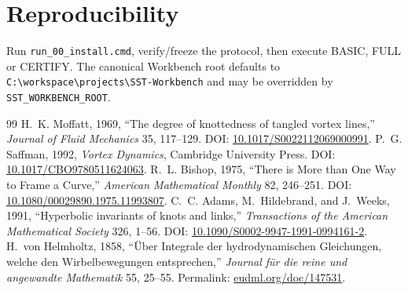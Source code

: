 \documentclass[11pt]{article}
\begin{document}
\section{Reproducibility}
Run \texttt{run\_00\_install.cmd}, verify/freeze the protocol, then execute BASIC, FULL or CERTIFY. The canonical Workbench root defaults to \texttt{C:\textbackslash workspace\textbackslash projects\textbackslash SST-Workbench} and may be overridden by \texttt{SST\_WORKBENCH\_ROOT}.

\begin{thebibliography}{99}
 H.~K. Moffatt, 1969, ``The degree of knottedness of tangled vortex lines,'' \emph{Journal of Fluid Mechanics} 35, 117--129. DOI: \href{https://doi.org/10.1017/S0022112069000991}{10.1017/S0022112069000991}.
 P.~G. Saffman, 1992, \emph{Vortex Dynamics}, Cambridge University Press. DOI: \href{https://doi.org/10.1017/CBO9780511624063}{10.1017/CBO9780511624063}.
 R.~L. Bishop, 1975, ``There is More than One Way to Frame a Curve,'' \emph{American Mathematical Monthly} 82, 246--251. DOI: \href{https://doi.org/10.1080/00029890.1975.11993807}{10.1080/00029890.1975.11993807}.
 C.~C. Adams, M.~Hildebrand, and J.~Weeks, 1991, ``Hyperbolic invariants of knots and links,'' \emph{Transactions of the American Mathematical Society} 326, 1--56. DOI: \href{https://doi.org/10.1090/S0002-9947-1991-0994161-2}{10.1090/S0002-9947-1991-0994161-2}.
 H.~von Helmholtz, 1858, ``\"Uber Integrale der hydrodynamischen Gleichungen, welche den Wirbelbewegungen entsprechen,'' \emph{Journal f\"ur die reine und angewandte Mathematik} 55, 25--55. Permalink: \href{https://eudml.org/doc/147531}{eudml.org/doc/147531}.
\end{thebibliography}
\end{document}
